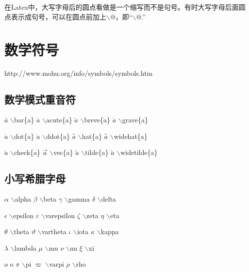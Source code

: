 \documentclass[UTF8]{ctexart}
\begin{document}
在Latex中，大写字母后的圆点看做是一个缩写而不是句号。有时大写字母后面圆点表示成句号，可以在圆点前加上$\backslash$@，即“$\backslash$@.”



\section{数学符号}

http://www.mohu.org/info/symbols/symbols.htm

\subsection{数学模式重音符}

$\bar{a}$ \quad $\backslash$bar\{a\} \qquad
$\acute{a}$ \quad $\backslash$acute\{a\} \qquad
$\breve{a}$ \quad $\backslash$breve\{a\} \qquad
$\grave{a}$ \quad $\backslash$grave\{a\} \qquad

$\dot{a}$ \quad $\backslash$dot\{a\} \qquad
$\ddot{a}$ \quad $\backslash$ddot\{a\} \qquad
$\hat{a}$ \quad $\backslash$hat\{a\} \qquad
$\widehat{a}$ \quad $\backslash$widehat\{a\} \qquad

$\check{a}$ \quad $\backslash$check\{a\} \qquad
$\vec{a}$ \quad $\backslash$vec\{a\} \qquad
$\tilde{a}$ \quad $\backslash$tilde\{a\} \qquad
$\widetilde{a}$ \quad $\backslash$widetilde\{a\} \qquad

\subsection{小写希腊字母}

$\alpha$ \quad $\backslash$alpha \qquad
$\beta$ \quad $\backslash$beta \qquad
$\gamma$ \quad $\backslash$gamma \qquad
$\delta$ \quad $\backslash$delta \qquad

$\epsilon$ \quad $\backslash$epsilon \qquad
$\varepsilon$ \quad $\backslash$varepsilon \qquad
$\zeta$ \quad $\backslash$zeta \qquad
$\eta$ \quad $\backslash$eta \qquad

$\theta$ \quad $\backslash$theta \qquad
$\vartheta$ \quad $\backslash$vartheta \qquad
$\iota$ \quad $\backslash$iota \qquad
$\kappa$ \quad $\backslash$kappa \qquad

$\lambda$ \quad $\backslash$lambda \qquad
$\mu$ \quad $\backslash$mu \qquad
$\nu$ \quad $\backslash$nu \qquad
$\xi$ \quad $\backslash$xi \qquad

$o$ \quad o \qquad
$\pi$ \quad $\backslash$pi \qquad
$\varpi$ \quad $\backslash$varpi \qquad
$\rho$ \quad $\backslash$rho \qquad
\end{document}
